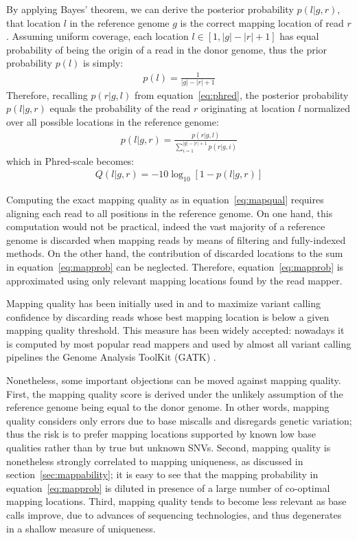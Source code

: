 By applying Bayes' theorem, we can derive the posterior probability $p(l|g,r)$, that location $l$ in the reference genome $g$ is the correct mapping location of read $r$.
Assuming uniform coverage, each location $l \in [1, |g| - |r| + 1]$ has equal probability of being the origin of a read in the donor genome, thus the prior probability $p(l)$ is simply:
\begin{eqnarray}
p(l) = \frac{1}{|g| - |r| + 1}
\end{eqnarray}
Therefore, recalling $p(r | g, l)$ from equation~\ref{eq:phred}, the posterior probability $p(l|g,r)$ equals the probability of the read $r$ originating at location $l$ normalized over all possible locations in the reference genome:
\begin{eqnarray}
\label{eq:mapprob}
p(l|g,r) = \frac{p(r|g,l)}{\sum_{i=1}^{|g| - |r| + 1}{p(r|g,i)}}
\end{eqnarray}
which in Phred-scale becomes:
\begin{eqnarray}
\label{eq:mapqual}
Q(l|g,r) = -10 \log_{10}[1 - p(l|g,r)]
\end{eqnarray}

Computing the exact mapping quality as in equation~\ref{eq:mapqual} requires aligning each read to all positions in the reference genome.
On one hand, this computation would not be practical, indeed the vast majority of a reference genome is discarded when mapping reads by means of filtering and fully-indexed methods.
On the other hand, the contribution of discarded locations to the sum in equation~\ref{eq:mapprob} can be neglected.
Therefore, equation~\ref{eq:mapprob} is approximated using only relevant mapping locations found by the read mapper.

Mapping quality has been initially used in \citep{Li2008} and \citep{Li2009} to maximize variant calling confidence by discarding reads whose best mapping location is below a given mapping quality threshold.
This measure has been widely accepted: nowadays it is computed by most popular read mappers and used by almost all variant calling pipelines \eg the Genome Analysis ToolKit (GATK) \citep{DePristo2011}.

Nonetheless, some important objections can be moved against mapping quality.
First, the mapping quality score is derived under the unlikely assumption of the reference genome being equal to the donor genome.
In other words, mapping quality considers only errors due to base miscalls and disregards genetic variation; thus the risk is to prefer mapping locations supported by known low base qualities rather than by true but unknown SNVs.
Second, mapping quality is nonetheless strongly correlated to mapping uniqueness, as discussed in section~\ref{sec:mappability}; it is easy to see that the mapping probability in equation~\ref{eq:mapprob} is diluted in presence of a large number of co-optimal mapping locations.
Third, mapping quality tends to become less relevant as base calls improve, due to advances of sequencing technologies, and thus degenerates in a shallow measure of uniqueness.

